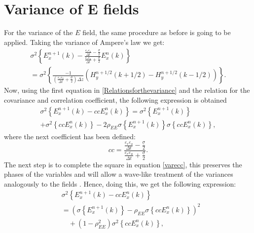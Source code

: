 \documentclass[12pt, oneside]{book}
\begin{document}
\section{Variance of E fields}
For the variance of the $E$ field, the same procedure as before is going to be applied. Taking the variance of Ampere's law we get:
\begin{equation}
\begin{gathered}
\sigma^{2}\left\{E_{x}^{n+1}(k)-\frac{\frac{\varepsilon_{r} \varepsilon_{o}}{\Delta t}-\frac{\underline{\sigma}}{2}}{\frac{\varepsilon_{r} \varepsilon_{o}}{\Delta t}+\frac{\underline{\sigma}}{2}} E_{x}^{n}(k)\right\} \\
=\sigma^{2}\left\{\frac { - 1 } { ( \frac { \varepsilon _ { r } \varepsilon _ { 0 } } { \Delta t } + \frac { \underline{\sigma} } { 2 } ) \Delta z } \left(H_{y}^{n+1 / 2}(k+1 / 2) -H_{y}^{n+1 / 2}(k-1 / 2)\right)\right\}.
\end{gathered}
\end{equation}
Now, using the first equation in \ref{Relationsforthevariance} and the relation for the covariance and correlation coefficient, the following expression is obtained
\begin{equation}\label{varecc}
\begin{gathered}
\sigma^{2}\left\{E_{x}^{n+1}(k)-c c E_{x}^{n}(k)\right\}=\sigma^{2}\left\{E_{x}^{n+1}(k)\right\} \\
+\sigma^{2}\left\{c c E_{x}^{n}(k)\right\}-2 \rho_{E E} \sigma\left\{E_{x}^{n+1}(k)\right\} \sigma\left\{c c E_{x}^{n}(k)\right\},
\end{gathered}
\end{equation}
where the next coefficient has been defined:
\begin{equation}
c c=\frac{\frac{\varepsilon_{r} \varepsilon_{o}}{\Delta t}-\frac{\underline{\sigma}}{2}}{\frac{\varepsilon_{r} \varepsilon_{a}}{\Delta t}+\frac{\underline{\sigma}}{2}}.
\end{equation}
The next step is to complete the square in equation \ref{varecc}, this preserves the phases of the variables and will allow a wave-like treatment of the variances analogously to the fields \cite{smith2012stochastic}. Hence, doing this, we get the following expression:
\begin{equation}
\begin{aligned}
&\sigma^{2}\left\{E_{x}^{n+1}(k)-c c E_{x}^{n}(k)\right\} \\
&=\left(\sigma\left\{E_{x}^{n+1}(k)\right\}-\rho_{E E} \sigma\left\{c c E_{x}^{n}(k)\right\}\right)^{2} \\
&\quad+\left(1-\rho_{E E}^{2}\right) \sigma^{2}\left\{c c E_{x}^{n}(k)\right\},
\end{aligned}
\end{equation}
\end{document}
